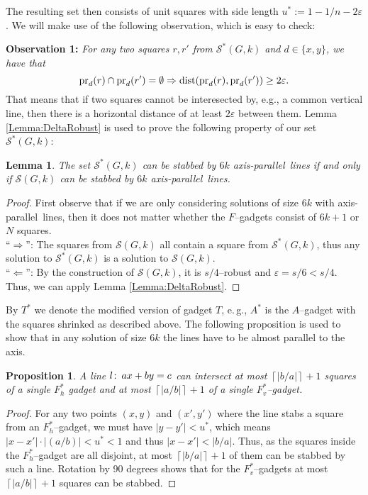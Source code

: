 \documentclass[12pt]{article}
\newtheorem{lemma}[definition]{Lemma}
\newtheorem{proposition}[definition]{Proposition}
\newcommand{\eps}{\varepsilon}
\newcommand{\co}{\colon\thinspace}
\newcommand{\ap}{a.p.\ }
\renewcommand{\ap}{axis-parallel\ }
\newcommand{\calS}{\mathcal{S}}
\newcommand{\dist}{\operatorname{dist}}
\newcommand{\follows}{\Rightarrow}
\newcommand{\rup}[1]{ \left\lceil  #1 \right\rceil}
\begin{document}
The resulting set then consists of unit squares with side length $u^* := 1 - 1/n - 2\eps$. 
We will make use of the following observation, which is easy to check:

\textbf{Observation 1: }\emph{For any two squares $r, r'$ from $\calS^*(G, k)$ and $d \in \{x, y\}$, we have that \[ \pr_d(r) \cap \pr_d(r') = \emptyset \follows \dist(\pr_d(r), \pr_d(r')) \geq 2\eps. \] }
That means that if two squares cannot be interesected by, e.g., a common vertical line, then there is a horizontal distance of at least $2\eps$ between them.
Lemma \ref{Lemma:DeltaRobust} is used to prove the following property of our set $\calS^*(G, k)$:
\begin{lemma}\label{Lemma:ShrinkingLemma}
The set $\calS^*(G, k)$ can be stabbed by $6k$ \ap lines if and only if $\calS(G, k)$ can be stabbed by $6k$ \ap lines.
\end{lemma}
\begin{proof}
First observe that if we are only considering solutions of size $6k$ with \ap lines, then it does not matter whether the $F$--gadgets consist of $6k+1$ or $N$ squares.\\
``$\Rightarrow$'': The squares from $\calS(G, k)$ all contain a square from $\calS^*(G, k)$, thus any solution to $\calS^*(G,k)$ is a solution to $\calS(G, k)$.\\
``$\Leftarrow$'': By the construction of $\calS(G, k)$, it is $s/4$--robust and $\eps = s/6 < s/4$. Thus, we can apply Lemma \ref{Lemma:DeltaRobust}. 
\end{proof}
By $T^*$ we denote the modified version of gadget $T$, e.\,g., $A^*$ is the $A$--gadget with the squares shrinked as described above. The following proposition is used to show that in any solution of size $6k$ the lines have to be almost parallel to the axis. 
\begin{proposition}\label{Proposition:MaxStab}
A line $l\co ax + by = c$ can intersect at most $\rup{|b/a|} + 1$ squares of a single $F_h^*$ gadget and at most $\rup{|a/b|} + 1$ of a single $F_v^*$--gadget.
\end{proposition}
\begin{proof} For any two points $(x, y)$ and $(x', y')$ where the line stabs a square from an $F_h^*$--gadget, we must have $|y - y'| < u^*$, which means $|x - x'|\cdot |(a/b)| < u^* < 1$ and thus $|x - x'| < |b/a|$. Thus, as the squares inside the $F_h^*$--gadget are all disjoint, at most $\rup{|b/a|} + 1$ of them can be stabbed by such a line. Rotation by 90 degrees shows that for the $F_v^*$--gadgets at most $\rup{|a/b|} + 1$ squares can be stabbed.

\end{proof}
\end{document}
